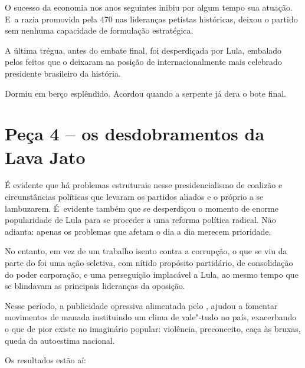 O sucesso da economia nos anos seguintes inibiu por algum tempo sua
atuação. E~a razia promovida pela  470 nas lideranças petistas
históricas, deixou o partido sem nenhuma capacidade de formulação
estratégica.

A última trégua, antes do embate final, foi desperdiçada por Lula,
embalado pelos feitos que o deixaram na posição de internacionalmente
mais celebrado presidente brasileiro da história.

Dormiu em berço esplêndido. Acordou quando a serpente já dera o bote
final.

\section{Peça 4 -- os desdobramentos da Lava Jato}

É evidente que há problemas estruturais nesse presidencialismo de
coalizão e circunstâncias políticas que levaram os partidos aliados e o
próprio  a se lambuzarem. É~evidente também que se desperdiçou o
momento de enorme popularidade de Lula para se proceder a uma reforma
política radical. Não adianta: apenas os problemas que afetam o dia a
dia merecem prioridade.

No entanto, em vez de um trabalho isento contra a corrupção, o que se
viu da parte do  foi uma ação seletiva, com nítido propósito
partidário, de consolidação do poder corporação, e uma perseguição
implacável a Lula, ao mesmo tempo que se blindavam as principais
lideranças da oposição.

Nesse período, a publicidade opressiva alimentada pelo , ajudou a
fomentar movimentos de manada instituindo um clima de vale"-tudo no país,
exacerbando o que de pior existe no imaginário popular: violência,
preconceito, caça às bruxas, queda da autoestima nacional.

Os resultados estão aí:

